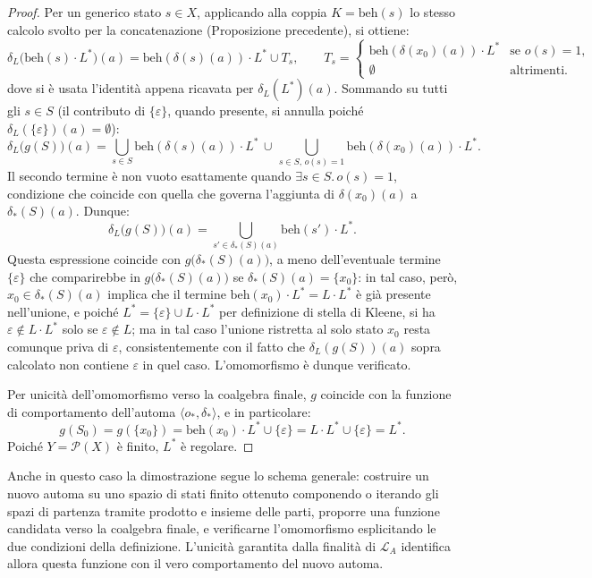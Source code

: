\begin{proof}
  Per un generico stato \(s \in X\), applicando alla coppia \(K = \mathrm{beh}(s)\) lo stesso calcolo svolto per la concatenazione (Proposizione precedente), si ottiene:
  \[
    \delta_L\bigl(\mathrm{beh}(s) \cdot L^*\bigr)(a) = \mathrm{beh}(\delta(s)(a)) \cdot L^* \cup T_s, \qquad T_s =
    \begin{cases}
      \mathrm{beh}(\delta(x_0)(a)) \cdot L^* & \text{se } o(s) = 1, \\
      \emptyset                              & \text{altrimenti.}
    \end{cases}
  \]
  dove si è usata l'identità appena ricavata per \(\delta_L(L^*)(a)\). Sommando su tutti gli \(s \in S\) (il contributo di \(\{\varepsilon\}\), quando presente, si annulla poiché \(\delta_L(\{\varepsilon\})(a) = \emptyset\)):
  \[
    \delta_L\bigl(g(S)\bigr)(a) = \bigcup_{s \in S} \mathrm{beh}(\delta(s)(a)) \cdot L^* \,\cup\, \bigcup_{s \in S,\, o(s) = 1} \mathrm{beh}(\delta(x_0)(a)) \cdot L^*.
  \]
  Il secondo termine è non vuoto esattamente quando \(\exists s \in S.\, o(s) = 1\), condizione che coincide con quella che governa l'aggiunta di \(\delta(x_0)(a)\) a \(\delta_*(S)(a)\). Dunque:
  \[
    \delta_L\bigl(g(S)\bigr)(a) = \bigcup_{s' \in \delta_*(S)(a)} \mathrm{beh}(s') \cdot L^*.
  \]
  Questa espressione coincide con \(g\bigl(\delta_*(S)(a)\bigr)\), a meno dell'eventuale termine \(\{\varepsilon\}\) che comparirebbe in \(g\bigl(\delta_*(S)(a)\bigr)\) se \(\delta_*(S)(a) = \{x_0\}\): in tal caso, però, \(x_0 \in \delta_*(S)(a)\) implica che il termine \(\mathrm{beh}(x_0) \cdot L^* = L \cdot L^*\) è già presente nell'unione, e poiché \(L^* = \{\varepsilon\} \cup L \cdot L^*\) per definizione di stella di Kleene, si ha \(\varepsilon \notin L \cdot L^*\) solo se \(\varepsilon \notin L\); ma in tal caso l'unione ristretta al solo stato \(x_0\) resta comunque priva di \(\varepsilon\), consistentemente con il fatto che \(\delta_L(g(S))(a)\) sopra calcolato non contiene \(\varepsilon\) in quel caso. L'omomorfismo è dunque verificato.

  Per unicità dell'omomorfismo verso la coalgebra finale, \(g\) coincide con la funzione di comportamento dell'automa \(\langle o_*, \delta_* \rangle\), e in particolare:
  \[
    g(S_0) = g(\{x_0\}) = \mathrm{beh}(x_0) \cdot L^* \cup \{\varepsilon\} = L \cdot L^* \cup \{\varepsilon\} = L^*.
  \]
  Poiché \(Y = \mathcal{P}(X)\) è finito, \(L^*\) è regolare.
\end{proof}

Anche in questo caso la dimostrazione segue lo schema generale: costruire un nuovo automa su uno spazio di stati finito ottenuto componendo o iterando gli spazi di partenza tramite prodotto e insieme delle parti, proporre una funzione candidata verso la coalgebra finale, e verificarne l'omomorfismo esplicitando le due condizioni della definizione. L'unicità garantita dalla finalità di \(\mathcal{L}_A\) identifica allora questa funzione con il vero comportamento del nuovo automa.

